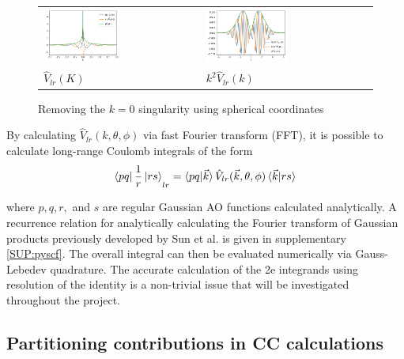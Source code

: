\documentclass[letterpaper, 12pt]{article}
\begin{document}
\begin{figure}[h]
	\begin{tabular}[m]{m{}m{}}
		\includegraphics[width=0.5\textwidth]{Images/FVlr.png}&
		\includegraphics[width=0.5\textwidth]{Images/FVlrk2.png} \\
		\centering $\hat{V}_{lr}(K)$ & 
		\centering $k^2 \hat{V}_{lr}(k)$
	\end{tabular}
	\caption{Removing the $k=0$ singularity using spherical coordinates}
	\label{FVLR}
\end{figure}

By calculating $ \hat{V}_{lr}(k, \theta, \phi)$ via fast Fourier transform (FFT), it is possible to calculate long-range Coulomb integrals of the form
\begin{equation}
\braket{pq|\, \frac{1}{r} \,|rs}_{lr} = \braket{pq | \vec{k}} \hat{V}_{lr}(\vec{k},\theta,\phi) \braket{\vec{k}|rs}
\end{equation}

where $p, q, r,$ and $s$ are regular Gaussian AO functions calculated analytically.
A recurrence relation for analytically calculating the Fourier transform of Gaussian products previously developed by Sun et al. \cite{sun} is given in supplementary \ref{SUP:pyscf}. The overall integral can then be evaluated numerically via Gauss-Lebedev quadrature. The accurate calculation of the 2e integrands using resolution of the identity is a non-trivial issue that will be investigated throughout the project. 

\subsection{Partitioning contributions in CC calculations}
\end{document}
